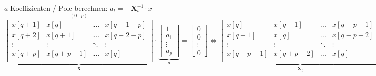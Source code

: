 	\renewcommand{\arraystretch}{1.0}
	\begin{aufzaehlung}
  		\item $a$-Koeffizienten / Pole berechnen: $a_t = - \bm X_t^{-1} \cdot x$  \small $$
		\overset{(0 \hdots p)}{\underbrace{\begin{bmatrix}
    		x[q+1] & x[q] & \hdots & x[q+1-p] \\                                   
    		x[q+2] & x[q+1] & \hdots & x[q+2-p] \\
    		\vdots & \vdots & \ddots & \vdots \\                             
    		x[q+p] & x[q+p-1] & \hdots & x[q] \\
		\end{bmatrix}  }_{\bm X}} \cdot \underbrace{\begin{bmatrix}
    		1 \\
    		a_1 \\
    		\vdots \\
    		a_p
		\end{bmatrix}  }_{a} = \begin{bmatrix}
    		0 \\
    		0 \\
    		\vdots \\
    		0
		\end{bmatrix} \Longleftrightarrow 
		\underbrace{ \begin{bmatrix}
    		x[q]     & x[q-1]   & \hdots & x[q-p+1] \\                                   
    		x[q+1]   & x[q]     & \hdots & x[q-p+2] \\
    		\vdots   & \vdots   & \ddots & \vdots \\                             
    		x[q+p-1] & x[q+p-2] & \hdots & x[q] \\
		\end{bmatrix}  
		}_{\bm  X_t} \cdot 
		\underbrace{\begin{bmatrix}
    		a_1 \\
    		a_2 \\
    		\vdots \\
    		a_p
		\end{bmatrix}  }_{a_t} = \underbrace{\begin{bmatrix}
    		-x [q+1]\\            
    		-x [q+2]\\
    		\vdots \\
    		-x [q+p]\\
		\end{bmatrix}}_{x} $$  \normalsize
		

\end{aufzaehlung}

